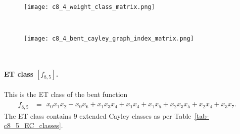 \begin{figure}[!bhpt] %
\centering
\begin{minipage}{.48\textwidth}
  \centering
  \texttt{[image: c8\_4\_weight\_class\_matrix.png]}
  \label{fig:c8_4_weight_class_matrix}
\end{minipage}%
~~~~
\begin{minipage}{.48\textwidth}
  \centering
  \texttt{[image: c8\_4\_bent\_cayley\_graph\_index\_matrix.png]}
  \label{fig:c8_4_bent_cayley_graph_index_matrix}
\end{minipage}
\end{figure}
~
\paragraph*{ET class $[f_{8,5}]$.}
%
This is the ET class of the bent function
\small{}
\begin{align*}
f_{ 8 , 5 } &=
\begin{array}{l}
x_{0} x_{1} x_{2} + x_{0} x_{6} + x_{1} x_{3} x_{4} + x_{1} x_{4} + x_{1} x_{5} + x_{2} x_{3} x_{5}
+ x_{2} x_{4} + x_{3} x_{7}.
\end{array}
\end{align*}
\normalsize{}
The ET class contains 9 extended Cayley classes as per
Table~\ref{tab-c8_5_EC_classes}.

